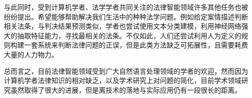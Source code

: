 


与此同时，受到计算机学者、法学学者共同关注的法律智能领域许多其他任务也被纷纷提出。希望能够帮助解决我们生活中的种种法学问题。例如给定案情描述判断相关法条，与判决结果预测类似，学者也尝试使用文本分类建模，利用神经网络强大的抽取特征能力，寻找最相关的法条。不仅如此，人们还尝试利用人为定义的规则构建一套系统来判断法律问题的正误，但是此类方法缺乏可拓展性，且需要耗费大量的人力物力。


总而言之，目前法律智能领域受到广大自然语言处理领域的学者的欢迎，然而因为计算机学者法律知识的相对缺乏，以及学术研究上对问题的简化，目前学术领域研究虽然取得了很大的进展，但是离技术的落地与实际应用仍有一段很长的距离。









